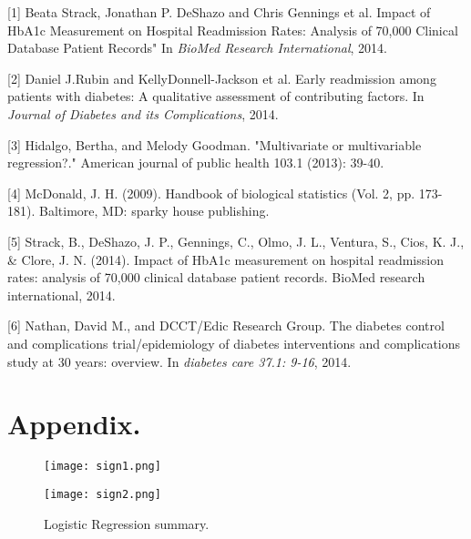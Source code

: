 \documentclass[twoside,11pt]{article}
\begin{document}




[1] Beata Strack, Jonathan P. DeShazo and Chris Gennings et al. Impact of HbA1c Measurement on Hospital Readmission Rates: Analysis of 70,000 Clinical Database Patient Records" In \emph{BioMed Research International}, 2014.

[2] Daniel J.Rubin and KellyDonnell-Jackson et al. Early readmission among patients with diabetes: A qualitative assessment of contributing factors. In \emph{Journal of Diabetes and its Complications}, 2014.

[3] Hidalgo, Bertha, and Melody Goodman. "Multivariate or multivariable regression?." American journal of public health 103.1 (2013): 39-40.

[4] McDonald, J. H. (2009). Handbook of biological statistics (Vol. 2, pp. 173-181). Baltimore, MD: sparky house publishing.

[5] Strack, B., DeShazo, J. P., Gennings, C., Olmo, J. L., Ventura, S., Cios, K. J., & Clore, J. N. (2014). Impact of HbA1c measurement on hospital readmission rates: analysis of 70,000 clinical database patient records. BioMed research international, 2014.

[6] Nathan, David M., and DCCT/Edic Research Group. The diabetes control and complications trial/epidemiology of diabetes interventions and complications study at 30 years: overview. In \emph{diabetes care 37.1: 9-16}, 2014.

\newpage
\appendix
\section*{Appendix.}

\begin{figure}[htbp!]
  \centering 
  \texttt{[image: sign1.png]} 
  \label{fig:example} 
\end{figure} 

\begin{figure}[htbp]
  \centering 
  \texttt{[image: sign2.png]} 
  \caption{Logistic Regression summary.}
  \label{fig:example} 
\end{figure} 
\end{document}

